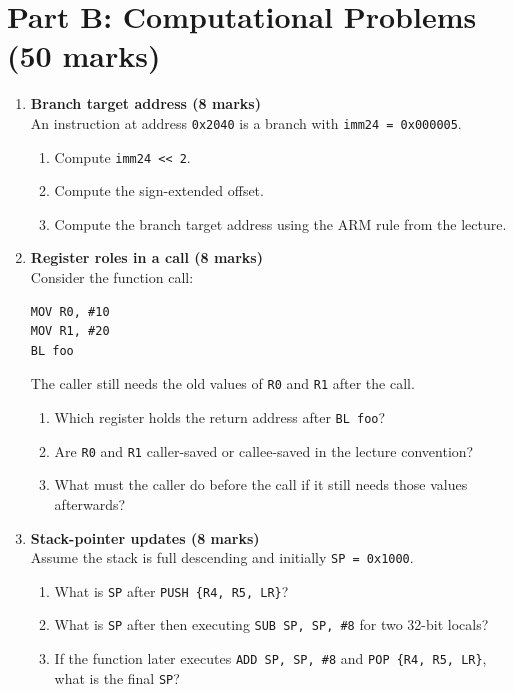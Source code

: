 \documentclass[11pt]{article}
\begin{document}
\section*{Part B: Computational Problems (50 marks)}
\begin{enumerate}[label=\textbf{B\arabic*.}]
  \item \textbf{Branch target address (8 marks)}\\
  An instruction at address \texttt{0x2040} is a branch with \texttt{imm24 = 0x000005}.
  \begin{enumerate}[label=(\alph*)]
    \item Compute \texttt{imm24 << 2}.
    \item Compute the sign-extended offset.
    \item Compute the branch target address using the ARM rule from the lecture.
  \end{enumerate}

  \item \textbf{Register roles in a call (8 marks)}\\
  Consider the function call:
\begin{verbatim}
MOV R0, #10
MOV R1, #20
BL foo
\end{verbatim}
  The caller still needs the old values of \texttt{R0} and \texttt{R1} after the call.
  \begin{enumerate}[label=(\alph*)]
    \item Which register holds the return address after \texttt{BL foo}?
    \item Are \texttt{R0} and \texttt{R1} caller-saved or callee-saved in the lecture convention?
    \item What must the caller do before the call if it still needs those values afterwards?
  \end{enumerate}

  \item \textbf{Stack-pointer updates (8 marks)}\\
  Assume the stack is full descending and initially \texttt{SP = 0x1000}.
  \begin{enumerate}[label=(\alph*)]
    \item What is \texttt{SP} after \texttt{PUSH \{R4, R5, LR\}}?
    \item What is \texttt{SP} after then executing \texttt{SUB SP, SP, \#8} for two 32-bit locals?
    \item If the function later executes \texttt{ADD SP, SP, \#8} and \texttt{POP \{R4, R5, LR\}}, what is the final \texttt{SP}?
  \end{enumerate}


\end{enumerate}
\end{document}
